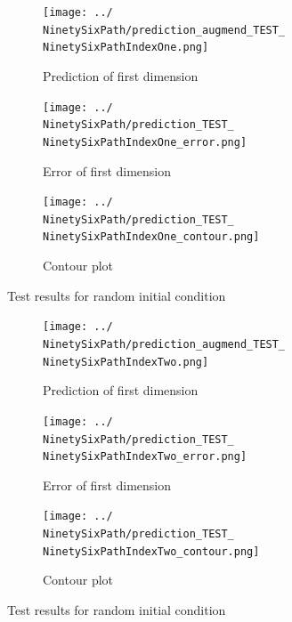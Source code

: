 	\begin{figure}[h]
		\centering
		\begin{subfigure}[b]{0.45\textwidth}
			\texttt{[image: ../\\NinetySixPath/prediction\_augmend\_TEST\_\\NinetySixPathIndexOne.png]}
			\caption{Prediction of first dimension}
		\end{subfigure}
		\begin{subfigure}[b]{0.45\textwidth}
			\texttt{[image: ../\\NinetySixPath/prediction\_TEST\_\\NinetySixPathIndexOne\_error.png]}
			\caption{Error of first dimension}
		\end{subfigure}
		\begin{subfigure}[b]{\textwidth}
			\texttt{[image: ../\\NinetySixPath/prediction\_TEST\_\\NinetySixPathIndexOne\_contour.png]}
			\caption{Contour plot}
		\end{subfigure}
		\caption{Test results for random initial condition \NinetySixPathIndexOne}
		\label{96:predictions1}
	\end{figure}
	\begin{figure}[h]
		\centering
		\begin{subfigure}[b]{0.45\textwidth}
			\texttt{[image: ../\\NinetySixPath/prediction\_augmend\_TEST\_\\NinetySixPathIndexTwo.png]}
			\caption{Prediction of first dimension}
		\end{subfigure}
		\begin{subfigure}[b]{0.45\textwidth}
			\texttt{[image: ../\\NinetySixPath/prediction\_TEST\_\\NinetySixPathIndexTwo\_error.png]}
			\caption{Error of first dimension}
		\end{subfigure}
		\begin{subfigure}[b]{\textwidth}
			\texttt{[image: ../\\NinetySixPath/prediction\_TEST\_\\NinetySixPathIndexTwo\_contour.png]}
			\caption{Contour plot}
		\end{subfigure}
		\caption{Test results for random initial condition \NinetySixPathIndexTwo}
		\label{96:predictions2}
	\end{figure}
	